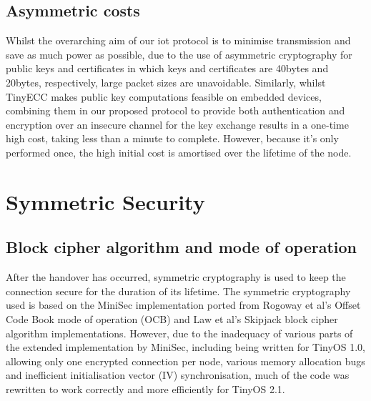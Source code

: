 \documentclass{mpaper}
\begin{document}
\subsection{Asymmetric costs} %
\label{sub:asymmetric_payload_sizes}
Whilst the overarching aim of our iot protocol is to minimise transmission and save as much power as possible, due to the use of asymmetric cryptography for public keys and certificates in which keys and certificates are 40bytes and 20bytes, respectively, large packet sizes are unavoidable. Similarly, whilst TinyECC makes public key computations feasible on embedded devices, combining them in our proposed protocol to provide both authentication and encryption over an insecure channel for the key exchange results in a one-time high cost, taking less than a minute to complete. However, because it's only performed once, the high initial cost is amortised over the lifetime of the node. 

\section{Symmetric Security} %
\label{sec:symmetric_security}
\subsection{Block cipher algorithm and mode of operation} %
\label{sub:cipher_block_algorithm_and_mode_of_operation}
After the handover has occurred, symmetric cryptography is used to keep the connection secure for the duration of its lifetime. The symmetric cryptography used is based on the MiniSec implementation ported from Rogoway et al's Offset Code Book mode of operation (OCB)\cite{OCB} and Law et al's Skipjack block cipher algorithm\cite{Skipjack} implementations. However, due to the inadequacy of various parts of the extended implementation by MiniSec\cite{MiniSecLink}, including being written for TinyOS 1.0, allowing only one encrypted connection per node, various memory allocation bugs and inefficient initialisation vector (IV) synchronisation, much of the code was rewritten to work correctly and more efficiently for TinyOS 2.1. 
\end{document}

